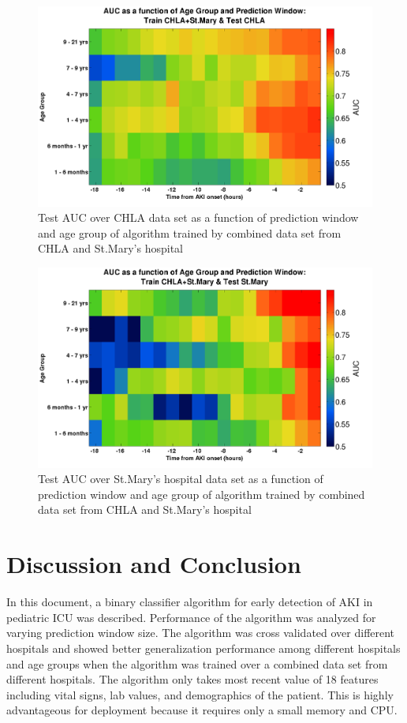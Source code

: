 \documentclass[
   technote
]{phildoc}
\begin{document}
\begin{figure}[!htbp]
\centering
\includegraphics[width=\textwidth]{./figures/auc_age_across_ism.png}
\caption{Test AUC over CHLA data set as a function of prediction window and age group of algorithm trained by combined data set from CHLA and St.Mary's hospital} 
\label{fig:age_across_ism}      
\end{figure}

\begin{figure}[!htbp]
\centering
\includegraphics[width=\textwidth]{./figures/auc_age_across_stm.png}
\caption{Test AUC over St.Mary's hospital data set as a function of prediction window and age group of algorithm trained by combined data set from CHLA and St.Mary's hospital} 
\label{fig:age_across_stm}      
\end{figure}

\chapter{Discussion and Conclusion}
In this document, a binary classifier algorithm for early detection of AKI in pediatric ICU was described. Performance of the algorithm was analyzed for varying prediction window size. The algorithm was cross validated over different hospitals and showed better generalization performance among different hospitals and age groups when the algorithm was trained over a combined data set from different hospitals. The algorithm only takes most recent value of 18 features including vital signs, lab values, and demographics of the patient. This is highly advantageous for deployment because it requires only a small memory and CPU.
\end{document}

